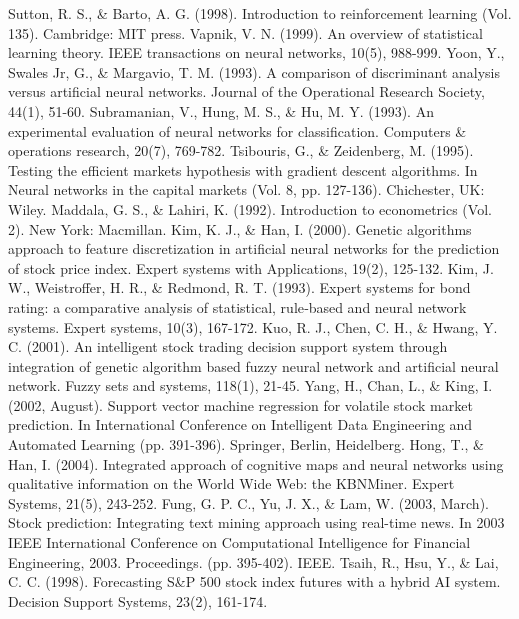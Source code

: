 \documentclass{article}
\begin{document}
\begin{thebibliography}{9}
Sutton, R. S., \& Barto, A. G. (1998). Introduction to reinforcement learning (Vol. 135). Cambridge: MIT press.
Vapnik, V. N. (1999). An overview of statistical learning theory. IEEE transactions on neural networks, 10(5), 988-999.
Yoon, Y., Swales Jr, G., \& Margavio, T. M. (1993). A comparison of discriminant analysis versus artificial neural networks. Journal of the Operational Research Society, 44(1), 51-60.
Subramanian, V., Hung, M. S., \& Hu, M. Y. (1993). An experimental evaluation of neural networks for classification. Computers \& operations research, 20(7), 769-782.
Tsibouris, G., \& Zeidenberg, M. (1995). Testing the efficient markets hypothesis with gradient descent algorithms. In Neural networks in the capital markets (Vol. 8, pp. 127-136). Chichester, UK: Wiley.
Maddala, G. S., \& Lahiri, K. (1992). Introduction to econometrics (Vol. 2). New York: Macmillan.
Kim, K. J., \& Han, I. (2000). Genetic algorithms approach to feature discretization in artificial neural networks for the prediction of stock price index. Expert systems with Applications, 19(2), 125-132.
Kim, J. W., Weistroffer, H. R., \& Redmond, R. T. (1993). Expert systems for bond rating: a comparative analysis of statistical, rule‐based and neural network systems. Expert systems, 10(3), 167-172.
Kuo, R. J., Chen, C. H., \& Hwang, Y. C. (2001). An intelligent stock trading decision support system through integration of genetic algorithm based fuzzy neural network and artificial neural network. Fuzzy sets and systems, 118(1), 21-45.
Yang, H., Chan, L., \& King, I. (2002, August). Support vector machine regression for volatile stock market prediction. In International Conference on Intelligent Data Engineering and Automated Learning (pp. 391-396). Springer, Berlin, Heidelberg.
Hong, T., \& Han, I. (2004). Integrated approach of cognitive maps and neural networks using qualitative information on the World Wide Web: the KBNMiner. Expert Systems, 21(5), 243-252.
Fung, G. P. C., Yu, J. X., \& Lam, W. (2003, March). Stock prediction: Integrating text mining approach using real-time news. In 2003 IEEE International Conference on Computational Intelligence for Financial Engineering, 2003. Proceedings. (pp. 395-402). IEEE.
Tsaih, R., Hsu, Y., \& Lai, C. C. (1998). Forecasting S\&P 500 stock index futures with a hybrid AI system. Decision Support Systems, 23(2), 161-174.
\end{thebibliography}
\end{document}
